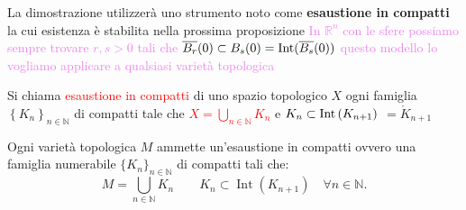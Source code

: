         La dimostrazione utilizzerà uno strumento noto come \textbf{esaustione in compatti} la cui esistenza è stabilita nella prossima proposizione
        \newpage
        \textcolor{violet}{In $\mathbb{R}^n$ con le sfere possiamo sempre trovare $r,s>0$ tali che $\overline{B_r}(0) \subset B_s(0)=\operatorname{Int}(\overline{B_s}(0))$
        questo modello lo vogliamo applicare a qualsiasi varietà topologica}
        \begin{definizione}
        Si chiama \textcolor{red}{esaustione in compatti} di uno spazio topologico $X$ ogni famiglia $\left\{K_n\right\}_{n \in \mathbb{N}}$ di compatti
        tale che \textcolor{red}{$\displaystyle X= \bigcup_{n \in \mathbb{N}} K_n$} e \textcolor{red}{$K_n \subset \operatorname{Int}\left(K_{n+1}\right)$} \textcolor{blu}{$=\mathring{K}_{n+1}$}
        \end{definizione}
        \begin{proposizione}
        \label{prop:esaustione_in_compatti}
        \mbox{}

        Ogni varietà topologica $M$ ammette un'esaustione in compatti ovvero una famiglia numerabile $\{K_n\}_{n \in \mathbb{N}}$ di compatti tali che:
        \[
        M = \bigcup_{n \in \mathbb{N}} K_n \qquad K_n \subset \operatorname{Int}(K_{n+1}) \quad \forall n \in \mathbb{N}.
        \]
        \end{proposizione}

